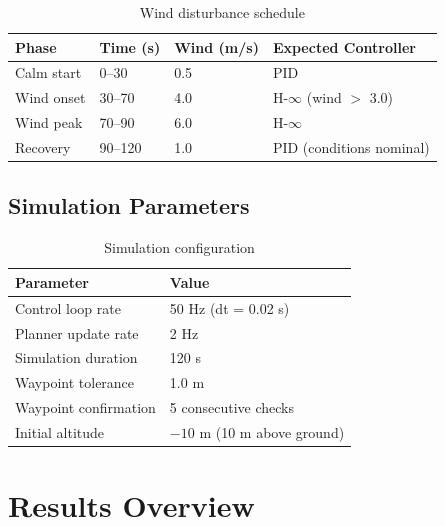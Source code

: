 \begin{table}[htbp]
    \centering
    \caption{Wind disturbance schedule}
    \label{tab:wind_schedule}
    \begin{tabular}{@{}llll@{}}
        \toprule
        \textbf{Phase} & \textbf{Time (s)} & \textbf{Wind (m/s)} & \textbf{Expected Controller} \\
        \midrule
        Calm start & 0--30 & 0.5 & PID \\
        Wind onset & 30--70 & 4.0 & H-$\infty$ (wind $>$ 3.0) \\
        Wind peak & 70--90 & 6.0 & H-$\infty$ \\
        Recovery & 90--120 & 1.0 & PID (conditions nominal) \\
        \bottomrule
    \end{tabular}
\end{table}

\subsection{Simulation Parameters}

\begin{table}[htbp]
    \centering
    \caption{Simulation configuration}
    \label{tab:sim_config}
    \begin{tabular}{@{}ll@{}}
        \toprule
        \textbf{Parameter} & \textbf{Value} \\
        \midrule
        Control loop rate & 50 Hz (dt = 0.02 s) \\
        Planner update rate & 2 Hz \\
        Simulation duration & 120 s \\
        Waypoint tolerance & 1.0 m \\
        Waypoint confirmation & 5 consecutive checks \\
        Initial altitude & $-10$ m (10 m above ground) \\
        \bottomrule
    \end{tabular}
\end{table}

\section{Results Overview}

